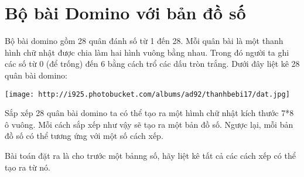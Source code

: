 \section{\textbf{    Bộ bài Domino với bản đồ số   }}




   Bộ bài domino gồm 28 quân đánh số từ 1 đến 28. Mỗi quân bài là một thanh hình chữ nhật được chia làm hai hình vuông bằng nhau. Trong đó người ta ghi các số từ 0 (để trống) đến 6 bằng cách trổ các dấu tròn trắng. Dưới đây liệt kê 28 quân bài domino:   



\texttt{[image: http://i925.photobucket.com/albums/ad92/thanhbebi17/dat.jpg]}


   Sắp xếp 28 quân bài domino ta có thể tạo ra một hìmh chữ nhật kích thước 7*8 ô vuông. Mỗi cách sắp xếp như vậy sẽ tạo ra một bản đồ số. Ngược lại, mỗi bản đồ số có thể tương ứng với một số cách xếp.   


   Bài toán đặt ra là cho trước một bảnng số, hãy liệt kê tất cả các cách xếp có thể tạo ra từ nó.